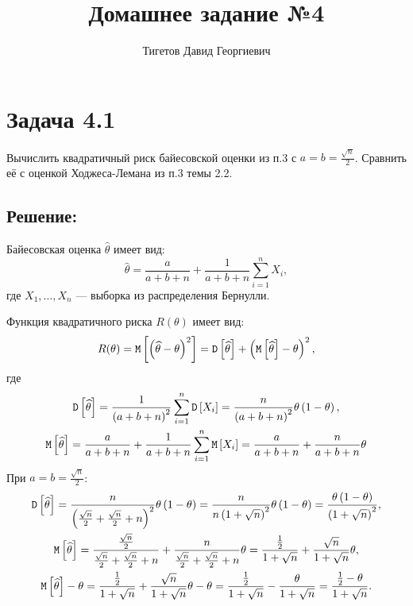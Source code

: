 \documentclass[12pt]{article}
\begin{document}
    \title{Домашнее задание №4}
    \author{Тигетов Давид Георгиевич}
    \date{}
    \maketitle

    \section*{Задача 4.1}
    Вычислить квадратичный риск байесовской оценки из п.3 с $a = b = \frac{\sqrt{n}}{2}$. Сравнить её с оценкой Ходжеса-Лемана из п.3 темы 2.2.

    \subsection*{Решение:}
    Байесовская оценка $\widehat{\theta}$ имеет вид:
    \[
        \widehat{\theta} = \frac{a}{a + b + n} + \frac{1}{a + b + n} \sum_{i=1}^n X_i,
    \]
    где $X_1, \dots, X_n$ --- выборка из распределения Бернулли.

    Функция квадратичного риска $R(\theta)$ имеет вид:
    \[
        R(\theta)
        = \mathtt{M} \left [ \left ( \widehat{\theta} - \theta \right )^2 \right ]
        = \mathtt{D} \left [ \widehat{\theta} \right ]
        + \left ( \mathtt{M} \left [ \widehat{\theta} \right ] - \theta \right )^2 ,
    \]
    где
    \begin{gather*}
        \mathtt{D} \left [ \widehat{\theta} \right ]
        = \frac{1}{\left ( a + b + n \right )^2} \sum_{i=1}^n \mathtt{D} \left [ X_i \right ]
        = \frac{n}{\left ( a + b + n \right )^2} \theta \left ( 1 - \theta \right ), \\
        \mathtt{M} \left [ \widehat{\theta} \right ]
        = \frac{a}{a + b + n} + \frac{1}{a + b + n} \sum_{i=1}^n \mathtt{M} \left [ X_i \right ]
        = \frac{a}{a + b + n} + \frac{n}{a + b + n} \theta
    \end{gather*}
    При $a = b = \frac{\sqrt{n}}{2}$:
    \begin{gather*}
        \mathtt{D} \left [ \widehat{\theta} \right ]
        = \frac{n}{\left ( \frac{\sqrt{n}}{2} + \frac{\sqrt{n}}{2} + n \right )^2} \theta \left ( 1 - \theta \right )
        = \frac{n}{n \left ( 1 + \sqrt{n} \right )^2} \theta \left ( 1 - \theta \right )
        = \frac{\theta \left ( 1 - \theta \right )}{\left ( 1 + \sqrt{n} \right )^2}, \\
        \mathtt{M} \left [ \widehat{\theta} \right ]
        = \frac{\frac{\sqrt{n}}{2}}{\frac{\sqrt{n}}{2} + \frac{\sqrt{n}}{2} + n} + \frac{n}{\frac{\sqrt{n}}{2} + \frac{\sqrt{n}}{2} + n} \theta
        = \frac{\frac{1}{2}}{1 + \sqrt{n}} + \frac{\sqrt{n}}{1 + \sqrt{n}} \theta , \\
        \mathtt{M} \left [ \widehat{\theta} \right ] - \theta
        = \frac{\frac{1}{2}}{1 + \sqrt{n}} + \frac{\sqrt{n}}{1 + \sqrt{n}} \theta - \theta
        = \frac{\frac{1}{2}}{1 + \sqrt{n}} - \frac{\theta}{1 + \sqrt{n}}
        = \frac{\frac{1}{2} - \theta}{1 + \sqrt{n}} .
    \end{gather*}
\end{document}
